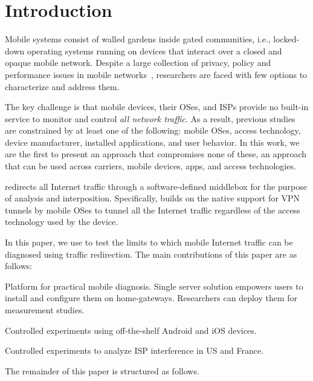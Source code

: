 \section{Introduction}
\label{sec:introduction}


Mobile systems consist of walled gardens inside gated communities, i.e., locked-down operating systems running on devices that interact over a closed and opaque mobile network. 
Despite a large collection of privacy, policy and performance issues in mobile networks~\cite{enck:taintdroid,hornyack:appfence,speedtest,pathak:eprof}, researchers are faced with few options to characterize and address them.


The key challenge is that mobile devices, their OSes, and ISPs provide no built-in service to monitor and control \emph{all network traffic}.
As a result, previous studies~\cite{vallina-rod:ads,gerber:passivespeed,chen:wifi,enck:taintdroid,wang:middleboxes,sommers:cellwifi} are constrained by at least one of the following: mobile OSes, access technology, device manufacturer, installed applications, and user behavior.
In this work, we are the first to present an approach that compromises none of these, an approach that can be used across carriers, mobile devices, apps, and access technologies.

\meddle redirects all Internet traffic through a software-defined middlebox for the purpose of analysis and interposition.
Specifically, \meddle builds on the native support for VPN tunnels by mobile OSes to tunnel all the Internet traffic regardless of the access technology used by the device. 



In this paper, we use \meddle to test the limits to which mobile Internet traffic can be diagnosed using traffic redirection.
The main contributions of this paper are as follows:
\begin{packedenumerate}
\item Platform for practical mobile diagnosis. Single server solution empowers users to install and configure them on home-gateways.
Researchers can deploy them for measurement studies. 
\item Controlled experiments using off-the-shelf Android and iOS devices. 
\item Controlled experiments to analyze ISP interference in US and France. 
\end{packedenumerate}

The remainder of this paper is structured as follows.


